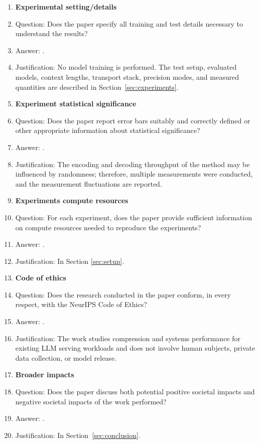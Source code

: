 \begin{enumerate}
\item {\bf Experimental setting/details}
    \item[] Question: Does the paper specify all training and test details necessary to understand the results?
    \item[] Answer: \answerYes{}.
    \item[] Justification: No model training is performed. The test setup, evaluated models, context lengths, transport stack, precision modes, and measured quantities are described in Section~\ref{sec:experiments}.

\item {\bf Experiment statistical significance}
    \item[] Question: Does the paper report error bars suitably and correctly defined or other appropriate information about statistical significance?
    \item[] Answer: \answerYes{}.
    \item[] Justification: The encoding and decoding throughput of the method may be influenced by randomness; therefore, multiple measurements were conducted, and the measurement fluctuations are reported.

\item {\bf Experiments compute resources}
    \item[] Question: For each experiment, does the paper provide sufficient information on compute resources needed to reproduce the experiments?
    \item[] Answer: \answerYes{}.
    \item[] Justification: In Section \ref{sec:setup}.

\item {\bf Code of ethics}
    \item[] Question: Does the research conducted in the paper conform, in every respect, with the NeurIPS Code of Ethics?
    \item[] Answer: \answerYes{}.
    \item[] Justification: The work studies compression and systems performance for existing LLM serving workloads and does not involve human subjects, private data collection, or model release.

\item {\bf Broader impacts}
    \item[] Question: Does the paper discuss both potential positive societal impacts and negative societal impacts of the work performed?
    \item[] Answer: \answerYes{}.
    \item[] Justification: In Section~\ref{sec:conclusion}.


\end{enumerate}
